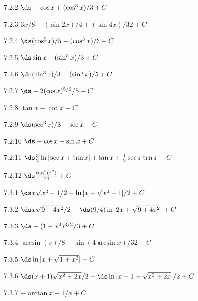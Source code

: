 \begin{Answer}{7.2.2}
 $\ds -\cos x+(\cos^3x)/3+C$
\end{Answer}
\begin{Answer}{7.2.3}
 $3x/8-(\sin 2x)/4+(\sin 4x)/32+C$
\end{Answer}
\begin{Answer}{7.2.4}
 $\ds (\cos^5 x)/5-(\cos^3x)/3+C$
\end{Answer}
\begin{Answer}{7.2.5}
 $\ds \sin x-(\sin^3x)/3+C$
\end{Answer}
\begin{Answer}{7.2.6}
 $\ds (\sin^3x)/3-(\sin^5x)/5+C$
\end{Answer}
\begin{Answer}{7.2.7}
 $\ds -2(\cos x)^{5/2}/5+C$
\end{Answer}
\begin{Answer}{7.2.8}
 $\tan x-\cot x+C$
\end{Answer}
\begin{Answer}{7.2.9}
 $\ds (\sec^3x)/3-\sec x+C$
\end{Answer}
\begin{Answer}{7.2.10}
 $\ds -\cos x+\sin x+C$
\end{Answer}
\begin{Answer}{7.2.11}
 $\ds \frac{3}{2}\ln|\sec x+\tan x|+\tan x+\frac{1}{2}\sec x\tan x+C$
\end{Answer}
\begin{Answer}{7.2.12}
 $\ds \frac{\tan^5(x^2)}{10}+C$
\end{Answer}
\begin{Answer}{7.3.1}
 $\ds x\sqrt{x^2-1}/2-\ln|x+\sqrt{x^2-1}|/2+C$
\end{Answer}
\begin{Answer}{7.3.2}
 $\ds x\sqrt{9+4x^2}/2+\hbox{$\ds(9/4)\ln|2x+\sqrt{9+4x^2}|+C$}$
\end{Answer}
\begin{Answer}{7.3.3}
 $\ds -(1-x^2)^{3/2}/3+C$
\end{Answer}
\begin{Answer}{7.3.4}
 $\arcsin(x)/8-\sin(4\arcsin x)/32+C$
\end{Answer}
\begin{Answer}{7.3.5}
 $\ds \ln|x+\sqrt{1+x^2}|+C$
\end{Answer}
\begin{Answer}{7.3.6}
 $\ds (x+1)\sqrt{x^2+2x}/2-\hbox{$\ds\ln|x+1+\sqrt{x^2+2x}|/2+C$}$
\end{Answer}
\begin{Answer}{7.3.7}
 $-\arctan x - 1/x+C$
\end{Answer}
